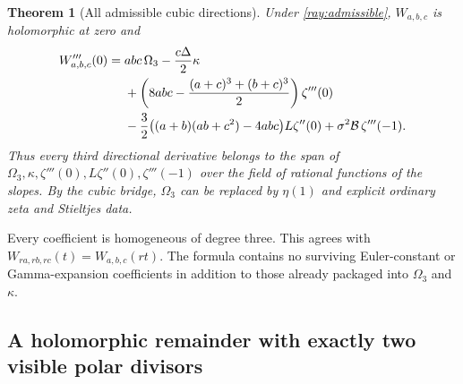 \documentclass[11pt]{article}
\numberwithin{equation}{section}
\newtheorem{theorem}{Theorem}[section]
\theoremstyle{definition}
\theoremstyle{remark}
\begin{document}
\begin{theorem}[All admissible cubic directions]\label{thm:cubic-rays}
Under \eqref{ray:admissible}, $W_{a,b,c}$ is holomorphic at zero and
\begin{align}
 W_{a,b,c}'''(0)={}&abc\,\Omega_3-\frac{c\Delta}{2}\kappa\notag\\
 &+\left(8abc-\frac{(a+c)^3+(b+c)^3}{2}\right)\zeta'''(0)\notag\\
 &-\frac32\bigl((a+b)(ab+c^2)-4abc\bigr)L\zeta''(0)
       +\sigma^2\mathcal B\,\zeta'''(-1).
 \label{ray:main}
\end{align}
Thus every third directional derivative belongs to the span of
$\Omega_3,\kappa,\zeta'''(0),L\zeta''(0),\zeta'''(-1)$ over
the field of rational functions of the slopes. By the cubic bridge,
$\Omega_3$ can be replaced by $\eta(1)$ and explicit ordinary zeta
and Stieltjes data.
\end{theorem}

Every coefficient is homogeneous of degree three. This agrees with
$W_{ra,rb,rc}(t)=W_{a,b,c}(rt)$. The formula contains no surviving
Euler-constant or Gamma-expansion coefficients in addition to those
already packaged into $\Omega_3$ and $\kappa$.

\subsection{A holomorphic remainder with exactly two visible polar divisors}
\end{document}
